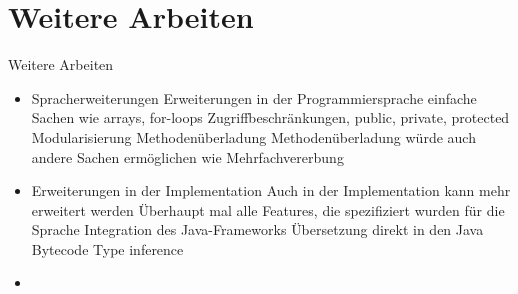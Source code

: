 
\section{Weitere Arbeiten}
\begin{frame}[t]{Weitere Arbeiten}
	\begin{itemize}[<+->]
		\item Spracherweiterungen
		 {Erweiterungen in der Programmiersprache}
		 {einfache Sachen wie arrays, for-loops}
		 {Zugriffbeschränkungen, public, private, protected}
		 {Modularisierung}
		 {Methodenüberladung}
		 {Methodenüberladung würde auch andere Sachen ermöglichen wie Mehrfachvererbung}

		\item Erweiterungen in der Implementation
		 {Auch in der Implementation kann mehr erweitert werden}
		 {Überhaupt mal alle Features, die spezifiziert wurden für die Sprache}
		 {Integration des Java-Frameworks}
		 {Übersetzung direkt in den Java Bytecode}
		 {Type inference}

		\item 
	\end{itemize}



\end{frame}
